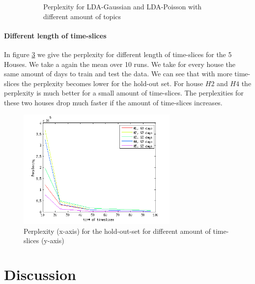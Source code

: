 \documentclass[11pt,a4paper]{article}
\begin{document}
\begin{figure}[h!]
\begin{subfigure}[b]{0.45\linewidth}
\caption{Perplexity for LDA-Gaussian and LDA-Poisson with different amount of topics}
  \label{fig:CompareK}
 \end{subfigure}
 \caption{}
 \label{fig:Compare}
\end{figure}


\paragraph{Different length of time-slices}

In figure \ref{fig:PerplTS} we give the perplexity for different length of time-slices for the 5 Houses. We take a again the mean over 10 runs. We take for every house the same amount of days to train and test the data. We can see that with more time-slices the perplexity becomes lower for the hold-out set. For house $H2$ and $H4$ the perplexity is much better for a small amount of time-slices. The perplexities for these two houses drop much faster if the amount of time-slices increases.

\begin{figure}[h!]
 \centering
 \includegraphics[width = 0.7\textwidth]{Pictures/PerplTS.png}
 \caption{Perplexity (x-axis) for the hold-out-set for different amount of time-slices (y-axis)}
 \label{fig:PerplTS}
\end{figure}


\pagebreak
 

\section{Discussion}
\label{sec:Disc}
\end{document}
